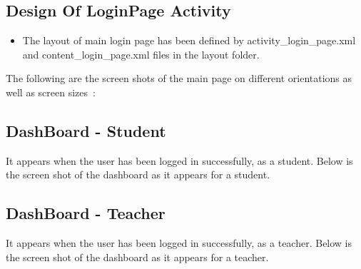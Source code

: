 \documentclass{article}
\begin{document}

\subsection{Design Of LoginPage Activity}
\begin{itemize}
\item The layout of main login page has been defined by activity\_login\_page.xml and content\_login\_page.xml files in the layout folder. 

\end{itemize} 

\par\noindent The following are the screen shots of the main page on different orientations as well as screen sizes~\cite{figures_in_latex}:



\subsection{DashBoard - Student}
It appears when the user has been logged in successfully, as a student. Below is the screen shot of the dashboard as it appears for a student.



\subsection{DashBoard - Teacher}
It appears when the user has been logged in successfully, as a teacher. Below is the screen shot of the dashboard as it appears for a teacher.
\end{document}
